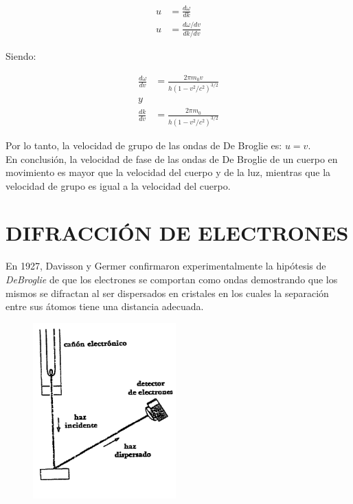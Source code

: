 \documentclass[a4paper]{article}
\begin{document}
    \begin{align}
        u &= \frac{d\omega}{dk} \tag*{} \\[10pt]
        u &= \frac{d\omega/dv}{dk/dv} \tag*{} 
    \end{align}

    \indent Siendo:

    \begin{align}
        \frac{d\omega}{dv} &= \frac{2 \pi m_0 v}{h(1-v^2/c^2)^{3/2}} \tag*{} \\[10pt]
        y \tag*{}\\[10pt]
        \frac{dk}{dv} &= \frac{2 \pi m_0}{h(1-v^2/c^2)^{3/2}} \tag*{}
    \end{align}

    \indent Por lo tanto, la velocidad de grupo de las ondas de De Broglie es: $u=v$.\\

    \indent En conclusión, la velocidad de fase de las ondas de De Broglie de un cuerpo en movimiento es mayor que la velocidad del cuerpo y de la luz, mientras que la velocidad de grupo es igual a la velocidad del cuerpo.\\

\section{DIFRACCIÓN DE ELECTRONES}

\indent En 1927, Davisson y Germer confirmaron experimentalmente la hipótesis de \textit{DeBroglie} de que los electrones se comportan como ondas demostrando que los mismos se difractan al ser dispersados en cristales en los cuales la separación entre sus átomos tiene una distancia adecuada.\\

    \begin{figure}[h!]
        \centering
        \includegraphics[width = 5.5cm]{../Experimento.png}
    \end{figure}
\end{document}
